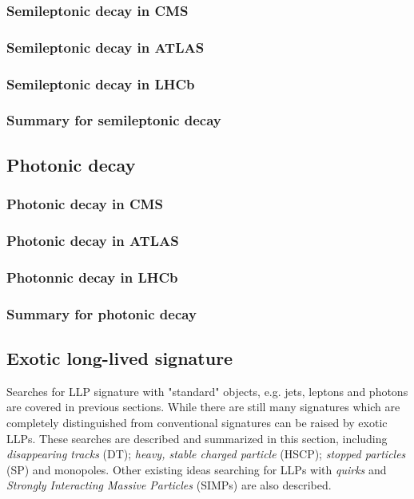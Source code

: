 \subsubsection{Semileptonic decay in CMS}

\subsubsection{Semileptonic decay in ATLAS}

\subsubsection{Semileptonic decay in LHCb}

\subsubsection{Summary for semileptonic decay}

\subsection{Photonic decay}

\subsubsection{Photonic decay in CMS}

\subsubsection{Photonic decay in ATLAS}

\subsubsection{Photonnic decay in LHCb}

\subsubsection{Summary for photonic decay}

\subsection{Exotic long-lived signature}

Searches for LLP signature with "standard" objects, e.g. jets, leptons and photons are covered in previous sections. While there are still many signatures which are completely distinguished from conventional signatures can be raised by exotic LLPs. These searches are described and summarized in this section, including \textit{disappearing tracks} (DT); \textit{heavy, stable charged particle} (HSCP); \textit{stopped particles} (SP) and monopoles. Other existing ideas searching for LLPs with \textit{quirks} and \textit{Strongly Interacting Massive Particles} (SIMPs) are also described. 

